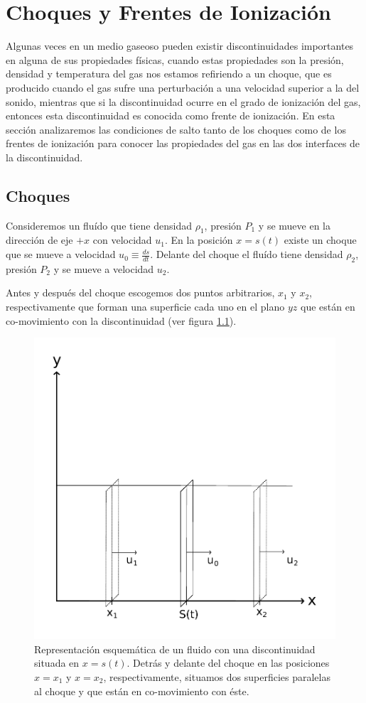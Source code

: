 \appendix
\newcommand{\norm}[1]{\left\lVert#1\right\rVert}

\chapter{Choques y Frentes de Ionización}
\thispagestyle{empty}
Algunas veces en un medio gaseoso pueden existir discontinuidades importantes en alguna de sus propiedades físicas, cuando estas propiedades son la presión, densidad y temperatura del gas nos estamos refiriendo a un choque, que es producido cuando el gas sufre una perturbación a una velocidad superior a la del sonido, mientras que si la discontinuidad ocurre en el grado de ionización del gas, entonces esta discontinuidad es conocida como frente de ionización. En esta sección analizaremos las condiciones de salto tanto de los choques como de los frentes de ionización para conocer las propiedades del gas en las dos interfaces de la discontinuidad.
\section{Choques}

Consideremos un fluído que tiene densidad $\rho_1$, presión $P_1$ y se mueve en la dirección de eje $+x$ con velocidad $u_1$. En la posición $x = s(t)$ existe un choque que se mueve a velocidad $u_0\equiv \frac{ds}{dt}$. Delante del choque el fluído tiene densidad $\rho_2$, presión $P_2$ y se mueve a velocidad $u_2$.

Antes y después del choque escogemos dos puntos arbitrarios, $x_1$ y $x_2$, respectivamente que forman una superficie cada uno en el plano $yz$ que están en co-movimiento con la discontinuidad (ver figura \ref{fig:shock}). 

\begin{figure}
  \includegraphics[width=0.7\linewidth]{./Figures/shock}
  \caption{Representación esquemática de un fluido con una discontinuidad situada en $x=s(t)$. Detrás y delante del choque en las posiciones $x=x_1$ y $x=x_2$, respectivamente, situamos dos superficies paralelas al choque y que están en co-movimiento con éste.}
  \label{fig:shock}
\end{figure}

